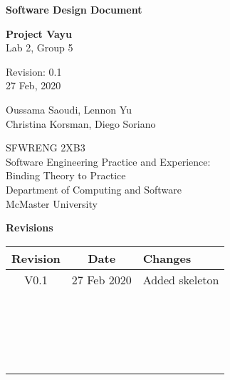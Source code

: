 \documentclass[12pt]{article}
\begin{document}
\begin{titlepage}
    \begin{center}
        \vspace*{1cm}
            
        \Huge
        \textbf{Software Design Document}
 
        \LARGE
        \vspace{0.5cm}
        \textbf{Project Vayu}\\
        \vspace{0.2cm}
        Lab 2, Group 5
 
        \vspace{0.5cm}
        Revision: 0.1\\
        \vspace{0.2cm}
        27 Feb, 2020
            
        \vspace{1.5cm}
            
        \Large
        Oussama Saoudi, Lennon Yu\\
        Christina Korsman, Diego Soriano
 
        \vfill
            
        \vspace{0.8cm}
                        
        \large
        SFWRENG 2XB3\\
        Software Engineering Practice and Experience:\\
        Binding Theory to Practice\\
        Department of Computing and Software\\
        McMaster University            
    \end{center}
\end{titlepage}
 
\newpage
\Large \noindent \textbf{Revisions}\\
\normalsize
\begin{center}
    \begin{tabular}{|| c | c | p{7cm} ||} 
    \hline
    Revision & Date & Changes\\
    \hline\hline
    V0.1 & 27 Feb 2020 & Added skeleton \\ 
    \hline
    ~ & ~ & ~ \\
    \hline
    ~ & ~ & ~ \\
    \hline
    ~ & ~ & ~ \\
    \hline
    ~ & ~ & ~ \\
    \hline
\end{tabular}
\end{center}
 
\end{document}
